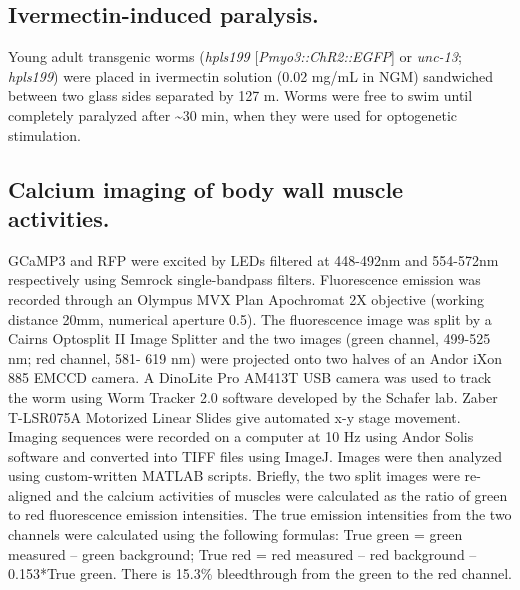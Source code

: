 \subsection{Ivermectin-induced paralysis.}
Young adult transgenic worms (\textit{hpls199} [\textit{Pmyo3::ChR2::EGFP}] 
or \textit{unc-13}; \textit{hpls199}) were placed in ivermectin solution (0.02 mg/mL in NGM) sandwiched 
between two glass sides separated by 127 \textmu m. Worms were free to swim until completely 
paralyzed after \textasciitilde 30 min, when they were used for optogenetic stimulation.

\subsection{Calcium imaging of body wall muscle activities.}

GCaMP3 and RFP were excited by LEDs 
filtered at 448-492nm and 554-572nm respectively using Semrock single-bandpass filters. 
Fluorescence emission was recorded through an Olympus MVX Plan Apochromat 2X objective 
(working distance 20mm, numerical aperture 0.5). The fluorescence image was split by a Cairns 
Optosplit II Image Splitter and the two images (green channel, 499-525 nm; red channel, 581- 
619 nm) were projected onto two halves of an Andor iXon 885 EMCCD camera. A DinoLite Pro 
AM413T USB camera was used to track the worm using Worm Tracker 2.0 software developed 
by the Schafer lab. Zaber T-LSR075A Motorized Linear Slides give automated x-y stage 
movement. Imaging sequences were recorded on a computer at 10 Hz using Andor Solis 
software and converted into TIFF files using ImageJ. Images were then analyzed using custom-written MATLAB scripts. Briefly, the two split images were re-aligned and the calcium activities 
of muscles were calculated as the ratio of green to red fluorescence emission intensities. The true 
emission intensities from the two channels were calculated using the following formulas: True 
green = green measured – green background; True red = red measured – red background – 
0.153*True green. There is 15.3\% bleedthrough from the green to the red channel. 

